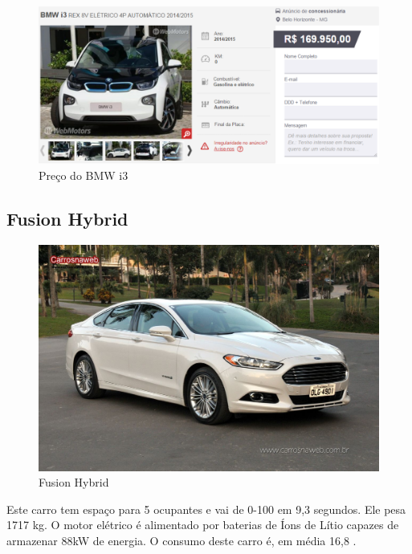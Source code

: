 \begin{figure}[H]
\begin{center}
\includegraphics[keepaspectratio,scale=0.5]{figuras/i3preco.eps}
\caption{Preço do BMW i3}
\end{center}
\end{figure}

\subsection{Fusion Hybrid}

\begin{figure}[H]
\begin{center}
\includegraphics[keepaspectratio,scale=0.15]{figuras/fusion.eps}
\caption{Fusion Hybrid}
\end{center}
\end{figure}


Este carro tem espaço para 5 ocupantes e vai de 0-100 \nicefrac{\si{\kilo\meter}}{\si{\hour}} em 9,3 segundos. Ele pesa 1717 \si{\kilo\gram}. O motor elétrico é alimentado por baterias de Íons de Lítio capazes de armazenar 88\si{\kilo\watt} de energia. O consumo deste carro é, em média 16,8 \nicefrac{\si{\kilo\meter}}{\si{\liter}}.


